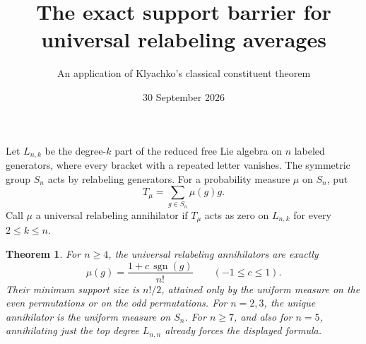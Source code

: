 \documentclass[11pt]{article}
\title{The exact support barrier for universal relabeling averages}
\author{An application of Klyachko's classical constituent theorem}
\date{30 September 2026}
\newtheorem{theorem}{Theorem}
\newcommand{\sgn}{\operatorname{sgn}}
\begin{document}
\maketitle
Let $L_{n,k}$ be the degree-$k$ part of the reduced free Lie algebra on
$n$ labeled generators, where every bracket with a repeated letter
vanishes. The symmetric group $S_n$ acts by relabeling generators.
For a probability measure $\mu$ on $S_n$, put
\[
 T_\mu=\sum_{g\in S_n}\mu(g)g.
\]
Call $\mu$ a universal relabeling annihilator if $T_\mu$ acts as zero on
$L_{n,k}$ for every $2\le k\le n$.

\begin{theorem}\label{main}
For $n\ge4$, the universal relabeling annihilators are exactly
\[
 \mu(g)=\frac{1+c\,\sgn(g)}{n!}\qquad(-1\le c\le1).
\]
Their minimum support size is $n!/2$, attained only by the uniform
measure on the even permutations or on the odd permutations.
For $n=2,3$, the unique annihilator is the uniform measure on $S_n$.
For $n\ge7$, and also for $n=5$, annihilating just the top degree
$L_{n,n}$ already forces the displayed formula.
\end{theorem}
\end{document}
